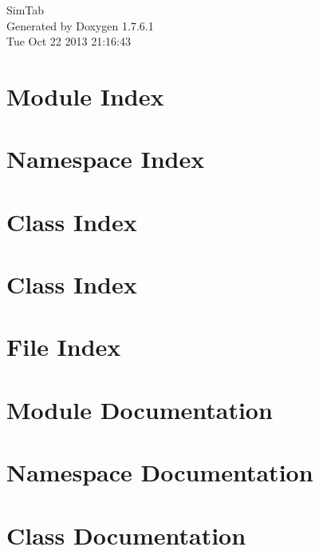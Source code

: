 \documentclass[a4paper]{article}
\begin{document}
\hypersetup{pageanchor=false,citecolor=blue}
\begin{titlepage}
\vspace*{7cm}
\begin{center}
{\Large \-Sim\-Tab }\\
\vspace*{1cm}
{\large \-Generated by Doxygen 1.7.6.1}\\
\vspace*{0.5cm}
{\small Tue Oct 22 2013 21:16:43}\\
\end{center}
\end{titlepage}
\tableofcontents
{}
\hypersetup{pageanchor=true,citecolor=blue}
\section{\-Module \-Index}

\section{\-Namespace \-Index}

\section{\-Class \-Index}

\section{\-Class \-Index}

\section{\-File \-Index}

\section{\-Module \-Documentation}




\section{\-Namespace \-Documentation}

\section{\-Class \-Documentation}


























\end{document}
